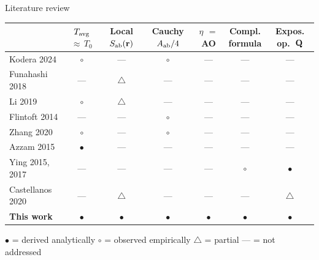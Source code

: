 \begin{frame}{Literature review}
\hypertarget{sum-lit}{}

  {\small
  \begin{tabular}{l cccccc}
    \toprule
    & \makecell{$\Tavg$\\[-2pt]${\approx}\,T_0$}
    & \makecell{Local\\[-2pt]$S_{\mathrm{ab}}(\mathbf{r})$}
    & \makecell{Cauchy\\[-2pt]$A_{\mathrm{ab}}/4$}
    & \makecell{$\eta$\\[-2pt]$=$ AO}
    & \makecell{Compl.\\[-2pt]formula}
    & \makecell{Expos.\\[-2pt]op.\ $\mathbf{Q}$} \\
    \midrule
    Kodera 2024      & $\circ$ & ---   & $\circ$ & ---   & ---   & --- \\
    Funahashi 2018   & ---     & $\triangle$ & ---   & ---   & ---   & --- \\
    Li 2019          & $\circ$ & $\triangle$ & ---   & ---   & ---   & --- \\
    Flintoft 2014    & ---     & ---   & $\circ$ & ---   & ---   & --- \\
    Zhang 2020       & $\circ$ & ---   & $\circ$ & ---   & ---   & --- \\
    Azzam 2015       & $\bullet$ & ---   & ---   & ---   & ---   & --- \\
    Ying 2015, 2017  & ---     & ---   & ---   & ---   & $\circ$ & $\bullet$ \\
    Castellanos 2020 & ---     & $\triangle$ & ---   & ---   & ---   & $\triangle$ \\
    \midrule
    \textbf{This work} & $\bullet$ & $\bullet$ & $\bullet$ & $\bullet$ & $\bullet$ & $\bullet$ \\
    \bottomrule
  \end{tabular}
  }

  \vspace{6pt}
  {\footnotesize
    $\bullet$ = derived analytically \quad
    $\circ$ = observed empirically \quad
    $\triangle$ = partial \quad
    --- = not addressed
  }

  \vspace{4pt}
  \hfill{}

\end{frame}
